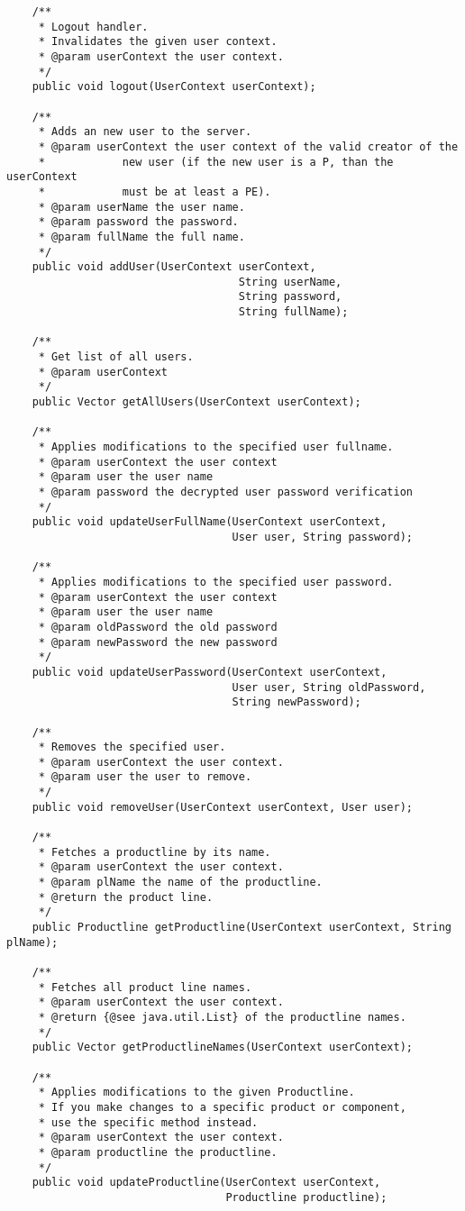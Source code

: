 \begin{verbatim}
	/**
	 * Logout handler.
	 * Invalidates the given user context.
	 * @param userContext the user context.
	 */
    public void logout(UserContext userContext);
	
	/**
	 * Adds an new user to the server.
	 * @param userContext the user context of the valid creator of the
	 * 			  new user (if the new user is a P, than the userContext
	 * 			  must be at least a PE).
	 * @param userName the user name.
	 * @param password the password.
	 * @param fullName the full name.
	 */
	public void addUser(UserContext userContext,
									String userName,
									String password,
									String fullName);
		
    /**
     * Get list of all users.
     * @param userContext
     */
    public Vector getAllUsers(UserContext userContext);
    
	/**
     * Applies modifications to the specified user fullname.
	 * @param userContext the user context
	 * @param user the user name
	 * @param password the decrypted user password verification
     */
    public void updateUserFullName(UserContext userContext,
    					           User user, String password);

	/**
     * Applies modifications to the specified user password.
	 * @param userContext the user context
	 * @param user the user name
	 * @param oldPassword the old password
	 * @param newPassword the new password
     */
    public void updateUserPassword(UserContext userContext,
    					   		   User user, String oldPassword,
    					   		   String newPassword);

	/**
     * Removes the specified user.
     * @param userContext the user context.
     * @param user the user to remove.
     */
    public void removeUser(UserContext userContext, User user);

    /**
     * Fetches a productline by its name.
     * @param userContext the user context.
     * @param plName the name of the productline.
     * @return the product line.
     */
    public Productline getProductline(UserContext userContext, String plName);

    /**
     * Fetches all product line names.
     * @param userContext the user context.
     * @return {@see java.util.List} of the productline names.
     */
    public Vector getProductlineNames(UserContext userContext);

    /**
	 * Applies modifications to the given Productline.
	 * If you make changes to a specific product or component,
	 * use the specific method instead.
	 * @param userContext the user context.
	 * @param productline the productline. 
	 */
	public void updateProductline(UserContext userContext,
								  Productline productline);
    

\end{verbatim}

